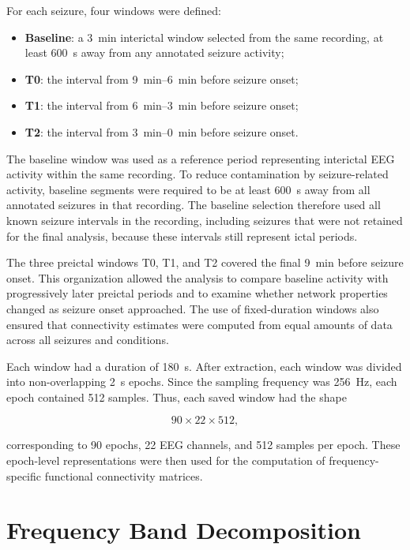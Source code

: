 For each seizure, four windows were defined:

\begin{itemize}
    \item \textbf{Baseline}: a \SI{3}{\minute} interictal window selected from
    the same recording, at least \SI{600}{\second} away from any annotated
    seizure activity;
    \item \textbf{T0}: the interval from \SIrange{9}{6}{\minute} before seizure
    onset;
    \item \textbf{T1}: the interval from \SIrange{6}{3}{\minute} before seizure
    onset;
    \item \textbf{T2}: the interval from \SIrange{3}{0}{\minute} before seizure
    onset.
\end{itemize}

The baseline window was used as a reference period representing interictal EEG
activity within the same recording. To reduce contamination by seizure-related
activity, baseline segments were required to be at least \SI{600}{\second}
away from all annotated seizures in that recording. The baseline selection
therefore used all known seizure intervals in the recording, including seizures
that were not retained for the final analysis, because these intervals still
represent ictal periods.

The three preictal windows T0, T1, and T2 covered the final \SI{9}{\minute}
before seizure onset. This organization allowed the analysis to compare
baseline activity with progressively later preictal periods and to examine
whether network properties changed as seizure onset approached. The use of
fixed-duration windows also ensured that connectivity estimates were computed
from equal amounts of data across all seizures and conditions.

Each window had a duration of \SI{180}{\second}. After extraction, each window
was divided into non-overlapping \SI{2}{\second} epochs. Since the sampling
frequency was \SI{256}{\hertz}, each epoch contained \num{512} samples. Thus,
each saved window had the shape

\[
    90 \times 22 \times 512,
\]

corresponding to \num{90} epochs, \num{22} EEG channels, and \num{512} samples
per epoch. These epoch-level representations were then used for the computation
of frequency-specific functional connectivity matrices.

\section{Frequency Band Decomposition}
\label{sec:frequency-band-decomposition}

